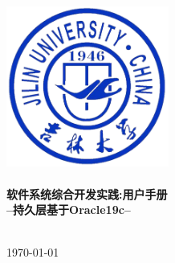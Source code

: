 \begin{titlepage}

\begin{center}


\includegraphics[width=0.4\textwidth]{figure/JLU}\\[1cm]    

%


\HRule \\[0.4cm]
{ \huge \bfseries 软件系统综合开发实践:用户手册}\\[0.4cm]
{  \bfseries --持久层基于Oracle19c--}\\[0.4cm]

\HRule \\[1.5cm]



\vfill

{\large \today}

\end{center}

\end{titlepage}

